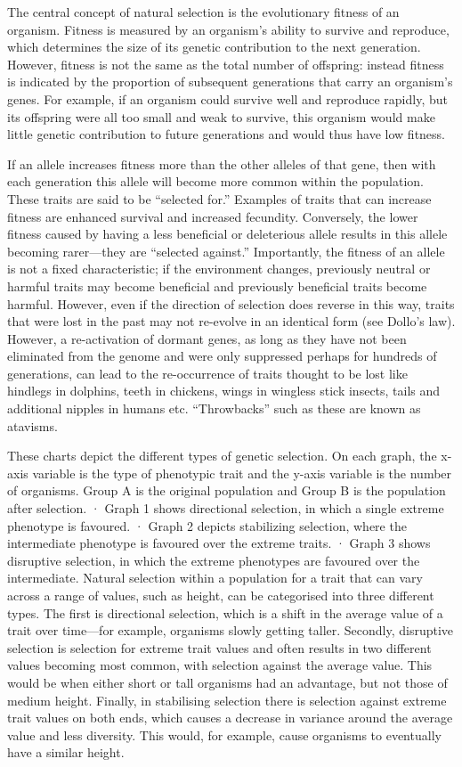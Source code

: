 The central concept of natural selection is the evolutionary fitness of an organism. Fitness is measured by an organism's ability to survive and reproduce, which determines the size of its genetic contribution to the next generation. However, fitness is not the same as the total number of offspring: instead fitness is indicated by the proportion of subsequent generations that carry an organism's genes. For example, if an organism could survive well and reproduce rapidly, but its offspring were all too small and weak to survive, this organism would make little genetic contribution to future generations and would thus have low fitness.

If an allele increases fitness more than the other alleles of that gene, then with each generation this allele will become more common within the population. These traits are said to be ``selected for.'' Examples of traits that can increase fitness are enhanced survival and increased fecundity. Conversely, the lower fitness caused by having a less beneficial or deleterious allele results in this allele becoming rarer---they are ``selected against.'' Importantly, the fitness of an allele is not a fixed characteristic; if the environment changes, previously neutral or harmful traits may become beneficial and previously beneficial traits become harmful. However, even if the direction of selection does reverse in this way, traits that were lost in the past may not re-evolve in an identical form (see Dollo's law). However, a re-activation of dormant genes, as long as they have not been eliminated from the genome and were only suppressed perhaps for hundreds of generations, can lead to the re-occurrence of traits thought to be lost like hindlegs in dolphins, teeth in chickens, wings in wingless stick insects, tails and additional nipples in humans etc. ``Throwbacks'' such as these are known as atavisms.

These charts depict the different types of genetic selection. On each graph, the x-axis variable is the type of phenotypic trait and the y-axis variable is the number of organisms. Group A is the original population and Group B is the population after selection.
· Graph 1 shows directional selection, in which a single extreme phenotype is favoured.
· Graph 2 depicts stabilizing selection, where the intermediate phenotype is favoured over the extreme traits.
· Graph 3 shows disruptive selection, in which the extreme phenotypes are favoured over the intermediate.
Natural selection within a population for a trait that can vary across a range of values, such as height, can be categorised into three different types. The first is directional selection, which is a shift in the average value of a trait over time---for example, organisms slowly getting taller. Secondly, disruptive selection is selection for extreme trait values and often results in two different values becoming most common, with selection against the average value. This would be when either short or tall organisms had an advantage, but not those of medium height. Finally, in stabilising selection there is selection against extreme trait values on both ends, which causes a decrease in variance around the average value and less diversity. This would, for example, cause organisms to eventually have a similar height.

